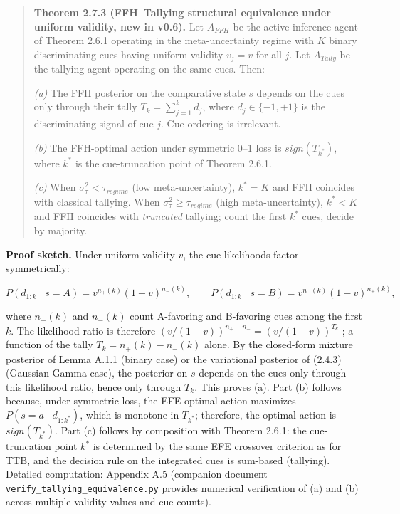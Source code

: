 \documentclass{article}
\begin{document}
\begin{quote}
\textbf{Theorem 2.7.3 (FFH--Tallying structural equivalence under
uniform validity, new in v0.6).} Let \(A_{FFH}\) be the active-inference
agent of Theorem 2.6.1 operating in the meta-uncertainty regime with
\(K\) binary discriminating cues having uniform validity \(v_{j} = v\)
for all \(j\). Let \(A_{Tally}\) be the tallying agent operating on the
same cues. Then:

\emph{(a)} The FFH posterior on the comparative state \(s\) depends on
the cues only through their tally \(T_{k} = \sum_{j = 1}^{k}d_{j}\),
where \(d_{j} \in \{ - 1, + 1\}\) is the discriminating signal of cue
\(j\). Cue ordering is irrelevant.

\emph{(b)} The FFH-optimal action under symmetric 0--1 loss is
\(sign(T_{k^{*}})\), where \(k^{*}\) is the cue-truncation point of
Theorem 2.6.1.

\emph{(c)} When \(\sigma_{\tau}^{2} < \tau_{regime}\) (low
meta-uncertainty), \(k^{*} = K\) and FFH coincides with classical
tallying. When \(\sigma_{\tau}^{2} \geq \tau_{regime}\) (high
meta-uncertainty), \(k^{*} < K\) and FFH coincides with \emph{truncated}
tallying; count the first \(k^{*}\) cues, decide by majority.
\end{quote}

\textbf{Proof sketch.} Under uniform validity \(v\), the cue likelihoods
factor symmetrically:

\[P(d_{1:k} \mid s = A) = v^{n_{+}(k)}(1 - v)^{n_{-}(k)},\quad\quad P(d_{1:k} \mid s = B) = v^{n_{-}(k)}(1 - v)^{n_{+}(k)},\]

where \(n_{+}(k)\) and \(n_{-}(k)\) count A-favoring and B-favoring cues
among the first \(k\). The likelihood ratio is therefore
\((v/(1 - v))^{n_{+} - n_{-}} = (v/(1 - v))^{T_{k}}\) ; a function of
the tally \(T_{k} = n_{+}(k) - n_{-}(k)\) alone. By the closed-form
mixture posterior of Lemma A.1.1 (binary case) or the variational
posterior of (2.4.3) (Gaussian-Gamma case), the posterior on \(s\)
depends on the cues only through this likelihood ratio, hence only
through \(T_{k}\). This proves (a). Part (b) follows because, under
symmetric loss, the EFE-optimal action maximizes
\(P(s = a \mid d_{1:k^{*}})\), which is monotone in \(T_{k^{*}}\);
therefore, the optimal action is \(sign(T_{k^{*}})\). Part (c) follows
by composition with Theorem 2.6.1: the cue-truncation point \(k^{*}\) is
determined by the same EFE crossover criterion as for TTB, and the
decision rule on the integrated cues is sum-based (tallying). Detailed
computation: Appendix A.5 (companion document
\texttt{verify\_tallying\_equivalence.py} provides numerical
verification of (a) and (b) across multiple validity values and cue
counts).
\end{document}
